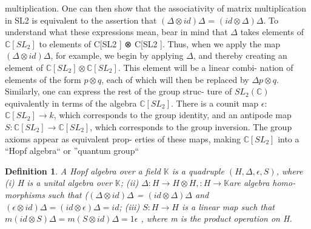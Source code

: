 \documentclass[preprint, 5p, 10pt]{elsarticle}
\theoremstyle{plain}
\newtheorem{definition}[theorem]{Definition}
\begin{document}
multiplication.
One can then show that the associativity of matrix
multiplication in SL2 is equivalent to the assertion
that $(\Delta \otimes id)\Delta$ = $(id \otimes \Delta)\Delta$. To understand what these
expressions mean, bear in mind that $\Delta$ takes elements
of $\mathbb{C}[SL_{2} ]$ to elements of C[SL2 ] ⊗ C[SL2 ]. Thus, when
we apply the map $(\Delta \otimes id)\Delta$, for example, we begin
by applying $\Delta$, and thereby creating an element of
$\mathbb{C}[SL_{2} ] \otimes \mathbb{C}[SL_{2} ]$. This element will be a linear combi-
nation of elements of the form $p \otimes q$, each of which will
then be replaced by $\Delta p \otimes q$.
Similarly, one can express the rest of the group struc-
ture of $SL_{2 }(\mathbb{C})$ equivalently in terms of the algebra
$\mathbb{C}[SL_{2} ]$. There is a counit map $\epsilon:$ $\mathbb{C}[SL_{2} ] \rightarrow k$, which
corresponds to the group identity, and an antipode map
$S : \mathbb{C}[SL_{2} ] \rightarrow \mathbb{C}[SL_{2} ]$, which corresponds to the group
inversion. The group axioms appear as equivalent prop-
erties of these maps, making $\mathbb{C}[SL_{2} ]$ into a “Hopf algebra`` or ''quantum group``
\begin{definition}
 A \textit{Hopf algebra} over a field $\mathbb{K}$ is a quadruple
$(H, \Delta,\epsilon , S)$, where
(i) H is a unital algebra over $\mathbb{K}$;
(ii) $\Delta : H \rightarrow H \otimes H, : H \rightarrow \mathbb{K} $are algebra homo-
morphisms such that ($(\Delta \otimes id)\Delta$ = $(id \otimes \Delta)\Delta$ and
$(\epsilon \otimes id)\Delta = (id \otimes \epsilon)\Delta = id$;
(iii) $S : H \rightarrow H$ is a linear map such that $m(id \otimes S)\Delta =
m(S\otimes id)\Delta = 1\epsilon$ , where m is the product operation
on H.


\end{definition}
\end{document}
